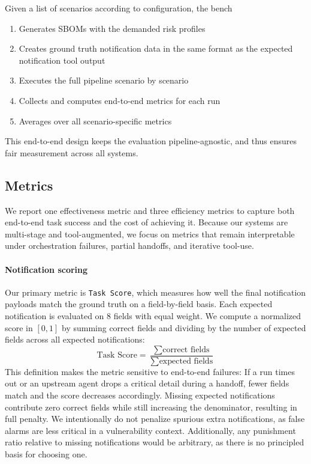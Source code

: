 Given a list of scenarios according to configuration, the bench 
\begin{enumerate}
    \item Generates SBOMs with the demanded risk profiles
    \item Creates ground truth notification data in the same format as the expected notification tool output
    \item Executes the full pipeline scenario by scenario
    \item Collects and computes end-to-end metrics for each run
    \item Averages over all scenario-specific metrics
\end{enumerate}
This end-to-end design keeps the evaluation pipeline-agnostic, and thus ensures fair measurement across all systems.

\subsection{Metrics}

We report one effectiveness metric and three efficiency metrics to capture both end-to-end task success and the cost of achieving it.
Because our systems are multi-stage and tool-augmented, we focus on metrics that remain interpretable under orchestration failures, partial handoffs, and iterative tool-use.

\paragraph{Notification scoring}
Our primary metric is \texttt{Task Score}, which measures how well the final notification payloads match the ground truth on a field-by-field basis.
Each expected notification is evaluated on $8$ fields with equal weight.
We compute a normalized score in $[0,1]$ by summing correct fields and dividing by the number of expected fields across all expected notifications:
\[
\text{Task Score} = \frac{\sum \text{correct fields}}{\sum \text{expected fields}}
\]
This definition makes the metric sensitive to end-to-end failures: If a run times out or an upstream agent drops a critical detail during a handoff, fewer fields match and the score decreases accordingly. Missing expected notifications contribute zero correct fields while still increasing the denominator, resulting in full penalty. We intentionally do not penalize spurious extra notifications, as false alarms are less critical in a vulnerability context. Additionally, any punishment ratio relative to missing notifications would be arbitrary, as there is no principled basis for choosing one.


